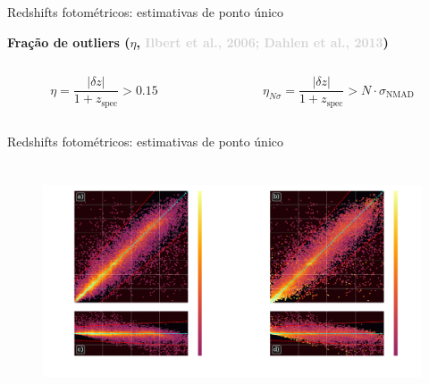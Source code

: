 \begin{frame}[c]{Redshifts fotométricos: estimativas de ponto único}
    \begin{splusbox}{\textbf{Fração de outliers ($\eta${, {\textcolor{LightGray}{Ilbert et al., 2006; Dahlen et al., 2013}}})}}
        \vspace{-.5cm}
        \begin{columns}[c]
            \begin{column}{0.46\textwidth}
                \centering
                \begin{equation*}
                    \eta = \frac{|\delta z|}{1+z_\text{spec}} > 0.15
                \end{equation*}
            \end{column}
            \begin{column}{0.46\textwidth}
                \centering
                \begin{equation*}
                    \eta_{N\sigma} = \frac{|\delta z|}{1+z_\text{spec}} > N \cdot \sigma_\text{NMAD}
                \end{equation*}
            \end{column}
            \hspace*{1cm}
        \end{columns}
    \end{splusbox}
\end{frame}

\begin{frame}[c]{Redshifts fotométricos: estimativas de ponto único}
    \begin{figure}
        \centering
        \includegraphics[height=7cm]{script/images/results_scatterplot_residuals.pdf}
    \end{figure}
\end{frame}

